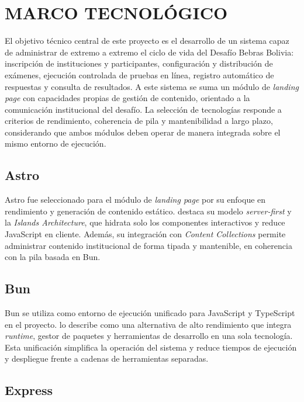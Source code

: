 \section{MARCO TECNOLÓGICO}

El objetivo técnico central de este proyecto es el desarrollo de un sistema capaz de administrar de extremo a extremo el ciclo de vida del Desafío Bebras Bolivia: inscripción de instituciones y participantes, configuración y distribución de exámenes, ejecución controlada de pruebas en línea, registro automático de respuestas y consulta de resultados. A este sistema se suma un módulo de \textit{landing page} con capacidades propias de gestión de contenido, orientado a la comunicación institucional del desafío. La selección de tecnologías responde a criterios de rendimiento, coherencia de pila y mantenibilidad a largo plazo, considerando que ambos módulos deben operar de manera integrada sobre el mismo entorno de ejecución.

\subsection{Astro}

Astro fue seleccionado para el módulo de \textit{landing page} por su enfoque en rendimiento y generación de contenido estático. \textcite{astro} destaca su modelo \textit{server-first} y la \emph{Islands Architecture}, que hidrata solo los componentes interactivos y reduce JavaScript en cliente. Además, su integración con \textit{Content Collections} permite administrar contenido institucional de forma tipada y mantenible, en coherencia con la pila basada en Bun.

\subsection{Bun}

Bun se utiliza como entorno de ejecución unificado para JavaScript y TypeScript en el proyecto. \textcite{bun} lo describe como una alternativa de alto rendimiento que integra \textit{runtime}, gestor de paquetes y herramientas de desarrollo en una sola tecnología. Esta unificación simplifica la operación del sistema y reduce tiempos de ejecución y despliegue frente a cadenas de herramientas separadas.

\subsection{Express}

